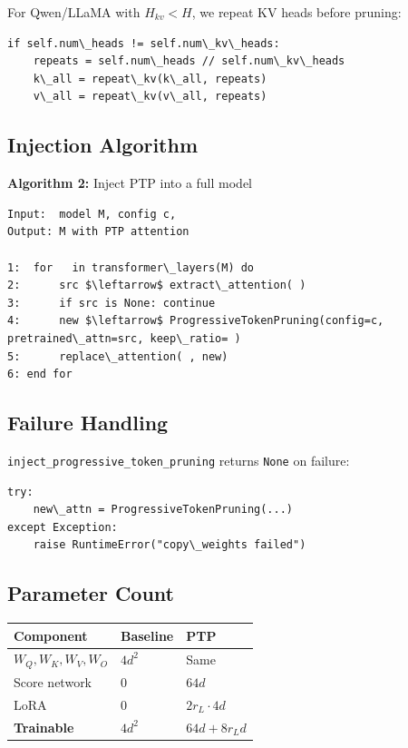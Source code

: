 For Qwen/LLaMA with $H_{kv} < H$, we repeat KV heads before pruning:

\begin{lstlisting}
if self.num\_heads != self.num\_kv\_heads:
    repeats = self.num\_heads // self.num\_kv\_heads
    k\_all = repeat\_kv(k\_all, repeats)
    v\_all = repeat\_kv(v\_all, repeats)
\end{lstlisting}

\subsection{Injection Algorithm}

\textbf{Algorithm 2:} Inject PTP into a full model
\begin{lstlisting}
Input:  model M, config c,  
Output: M with PTP attention

1:  for   in transformer\_layers(M) do
2:      src $\leftarrow$ extract\_attention( )
3:      if src is None: continue
4:      new $\leftarrow$ ProgressiveTokenPruning(config=c, pretrained\_attn=src, keep\_ratio= )
5:      replace\_attention( , new)
6: end for
\end{lstlisting}

\subsection{Failure Handling}

\texttt{inject\_progressive\_token\_pruning} returns \texttt{None} on failure:

\begin{lstlisting}
try:
    new\_attn = ProgressiveTokenPruning(...)
except Exception:
    raise RuntimeError("copy\_weights failed")
\end{lstlisting}

\subsection{Parameter Count}

\begin{table}[H]
\centering
\small
\begin{tabular}{lll}
\toprule
\textbf{Component} & \textbf{Baseline} & \textbf{PTP} \\
\midrule
$W_Q, W_K, W_V, W_O$ & $4 d^2$ & Same \\
Score network & 0 & $64 d$ \\
LoRA & 0 & $2 r_L \cdot 4 d$ \\
\textbf{Trainable} & $4 d^2$ & \textbf{$64 d + 8 r_L d$} \\
\bottomrule
\end{tabular}
\end{table}

